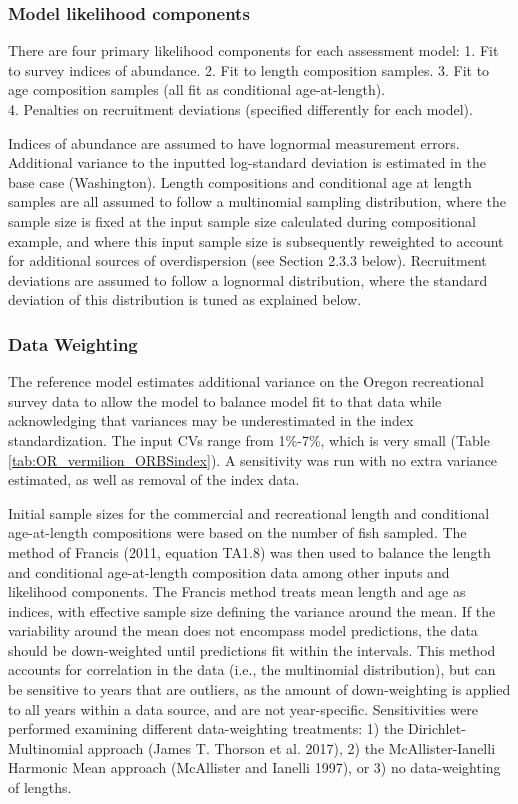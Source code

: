 \documentclass[11pt,
  english,
  letterpaper,
]{article}
\begin{document}
\hypertarget{model-likelihood-components}{%
\subsubsection{Model likelihood components}\label{model-likelihood-components}}

There are four primary likelihood components for each assessment model: 1. Fit to survey indices of abundance. 2. Fit to length composition samples. 3. Fit to age composition samples (all fit as conditional age-at-length).\\
4. Penalties on recruitment deviations (specified differently for each model).

Indices of abundance are assumed to have lognormal measurement errors. Additional variance to the inputted log-standard deviation is estimated in the base case (Washington). Length compositions and conditional age at length samples are all assumed to follow a multinomial sampling distribution, where the sample size is fixed at the input sample size calculated during compositional example, and where this input sample size is subsequently reweighted to account for additional sources of overdispersion (see Section 2.3.3 below). Recruitment deviations are assumed to follow a lognormal distribution, where the standard deviation of this distribution is tuned as explained below.

\hypertarget{data-weighting}{%
\subsubsection{Data Weighting}\label{data-weighting}}

The reference model estimates additional variance on the Oregon recreational survey data to allow the model to balance model fit to that data while acknowledging that variances may be underestimated in the index standardization. The input CVs range from 1\%-7\%, which is very small (Table \ref{tab:OR_vermilion_ORBSindex}). A sensitivity was run with no extra variance estimated, as well as removal of the index data.

Initial sample sizes for the commercial and recreational length and conditional age-at-length compositions were based on the number of fish sampled. The method of Francis (2011, equation TA1.8) was then used to balance the length and conditional age-at-length composition data among other inputs and likelihood components. The Francis method treats mean length and age as indices, with effective sample size defining the variance around the mean. If the variability around the mean does not encompass model predictions, the data should be down-weighted until predictions fit within the intervals. This method accounts for correlation in the data (i.e., the multinomial distribution), but can be sensitive to years that are outliers, as the amount of down-weighting is applied to all years within a data source, and are not year-specific. Sensitivities were performed examining different data-weighting treatments: 1) the Dirichlet-Multinomial approach (James T. Thorson et al. 2017), 2) the McAllister-Ianelli Harmonic Mean approach (McAllister and Ianelli 1997), or 3) no data-weighting of lengths.
\end{document}
